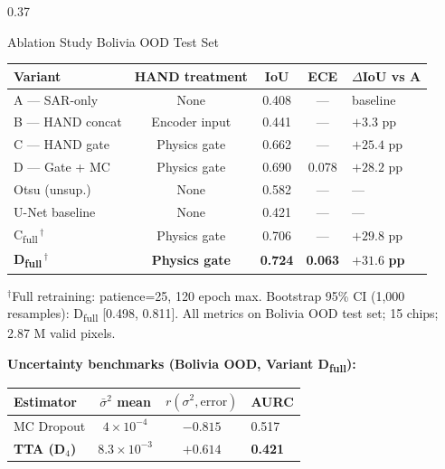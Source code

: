 \documentclass[final]{beamer}
\begin{document}
\begin{frame}[t,fragile]{}
\begin{columns}[T]
\begin{column}{0.37\textwidth}
\begin{tcolorbox}[posterbox]
\end{tcolorbox}

\vspace{8pt}

\begin{tcolorbox}[sectiontitle]
  \vphantom{Ag} Ablation Study \textemdash{} Bolivia OOD Test Set
\end{tcolorbox}
\vspace{4pt}
\begin{tcolorbox}[resultbox]
\begin{center}
\begin{tabular}{@{}lcccl@{}}
  \toprule
  \textbf{Variant} & \textbf{HAND treatment} & \textbf{IoU} & \textbf{ECE} &
  \textbf{$\Delta$IoU vs A} \\
  \midrule
  A — SAR-only      & None              & 0.408 & —     & baseline \\
  B — HAND concat   & Encoder input     & 0.441 & —     & $+3.3$ pp \\
  C — HAND gate     & Physics gate      & 0.662 & —     & $+25.4$ pp \\
  D — Gate + MC     & Physics gate      & 0.690 & 0.078 & $+28.2$ pp \\
  \midrule
  Otsu (unsup.)     & None              & 0.582 & —     & — \\
  U-Net baseline    & None              & 0.421 & —     & — \\
  \midrule
  C\textsubscript{full}\,$^\dagger$ & Physics gate & 0.706 & — & $+29.8$ pp \\
  \rowcolor{dkuLightTeal}
  \textbf{D\textsubscript{full}}\,$^\dagger$ & \textbf{Physics gate}
  & \textbf{0.724} & \textbf{0.063} & $\mathbf{+31.6}$ \textbf{pp} \\
  \bottomrule
\end{tabular}
\end{center}
\vspace{4pt}
{\footnotesize $^\dagger$Full retraining: patience=25, 120 epoch max. \quad
Bootstrap 95\% CI (1,000 resamples): D\textsubscript{full} [0.498, 0.811].
\quad All metrics on Bolivia OOD test set; 15 chips; 2.87 M valid pixels.}

\vspace{6pt}
\textbf{Uncertainty benchmarks (Bolivia OOD, Variant D\textsubscript{full}):}
\begin{center}
\begin{tabular}{@{}lccl@{}}
  \toprule
  Estimator & $\bar{\sigma}^2$ mean & $r(\sigma^2, \text{error})$ & AURC \\
  \midrule
  MC Dropout & $4\!\times\!10^{-4}$ & $-0.815$ \color{alertRed}{(inv.)} & 0.517 \\
  \textbf{TTA (D$_4$)} & $8.3\!\times\!10^{-3}$ & $\mathbf{+0.614}$ & \textbf{0.421} \\
  \bottomrule
\end{tabular}
\end{center}
\end{tcolorbox}


\end{column}
\end{columns}
\end{frame}
\end{document}
